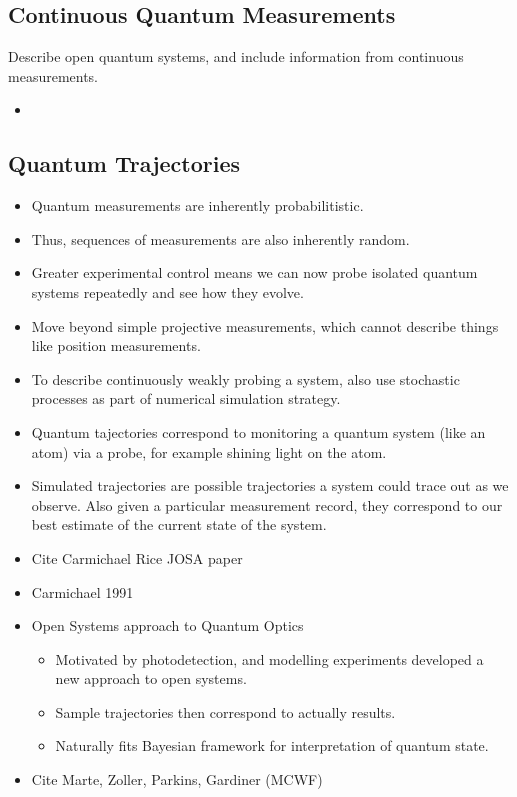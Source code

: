 \begin{itemize}
\section{Continuous Quantum Measurements}

Describe open quantum systems, and include information from continuous measurements. 
\begin{itemize}
  \item 
\end{itemize}


\subsection{Quantum Trajectories}

\begin{itemize}
\item Quantum measurements are inherently probabilitistic.  
\item Thus, sequences of measurements are also inherently random.  
\item Greater experimental control means we can now probe isolated quantum systems repeatedly and see how they evolve.  
\item Move beyond simple projective measurements, which cannot describe things like position measurements.
\item To describe continuously weakly probing a system, also use stochastic processes as part of
 numerical simulation strategy.
\item Quantum tajectories correspond to monitoring a quantum system (like an atom) via a probe,
 for example shining light on the atom. \cite{Carmichael1993}
\item Simulated trajectories are possible trajectories a system could trace out as we observe.
  Also given a particular measurement record, they correspond to our best estimate of the current state of the system.  
\end{itemize}



\begin{itemize}
\item Cite Carmichael Rice JOSA paper~\cite{Carmichael1989}
\item Carmichael 1991 ~\cite{Carmichael1991}
\item Open Systems approach to Quantum Optics\cite{Carmichael1993}
\begin{itemize}
\item Motivated by photodetection, and modelling experiments developed a new approach to open systems.  
\item Sample trajectories then correspond to actually results.
\item Naturally fits Bayesian framework for interpretation of quantum state.  
\end{itemize}
\item Cite Marte, Zoller, Parkins, Gardiner (MCWF)  \cite{Dalibard1992,Dum1992,Gardiner1992}


\end{itemize}
\end{itemize}
